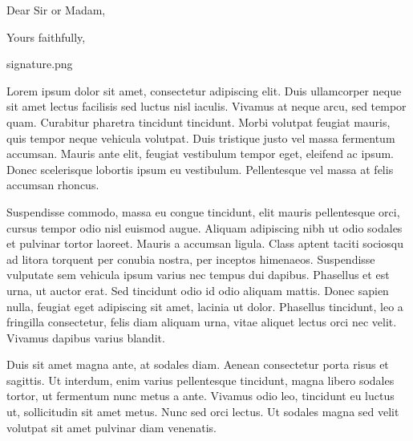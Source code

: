 \documentclass[11pt,a4paper,sans]{moderncv}        %
\begin{document}

\clearpage
\date{January 01, 1984}
\subject{Job application}
\opening{Dear Sir or Madam,}
\closing{Yours faithfully,}
\signature{0.9}{signature.png}                     %
\makelettertitle

Lorem ipsum dolor sit amet, consectetur adipiscing elit. Duis ullamcorper neque sit amet lectus facilisis sed luctus nisl iaculis. Vivamus at neque arcu, sed tempor quam. Curabitur pharetra tincidunt tincidunt. Morbi volutpat feugiat mauris, quis tempor neque vehicula volutpat. Duis tristique justo vel massa fermentum accumsan. Mauris ante elit, feugiat vestibulum tempor eget, eleifend ac ipsum. Donec scelerisque lobortis ipsum eu vestibulum. Pellentesque vel massa at felis accumsan rhoncus.

Suspendisse commodo, massa eu congue tincidunt, elit mauris pellentesque orci, cursus tempor odio nisl euismod augue. Aliquam adipiscing nibh ut odio sodales et pulvinar tortor laoreet. Mauris a accumsan ligula. Class aptent taciti sociosqu ad litora torquent per conubia nostra, per inceptos himenaeos. Suspendisse vulputate sem vehicula ipsum varius nec tempus dui dapibus. Phasellus et est urna, ut auctor erat. Sed tincidunt odio id odio aliquam mattis. Donec sapien nulla, feugiat eget adipiscing sit amet, lacinia ut dolor. Phasellus tincidunt, leo a fringilla consectetur, felis diam aliquam urna, vitae aliquet lectus orci nec velit. Vivamus dapibus varius blandit.

Duis sit amet magna ante, at sodales diam. Aenean consectetur porta risus et sagittis. Ut interdum, enim varius pellentesque tincidunt, magna libero sodales tortor, ut fermentum nunc metus a ante. Vivamus odio leo, tincidunt eu luctus ut, sollicitudin sit amet metus. Nunc sed orci lectus. Ut sodales magna sed velit volutpat sit amet pulvinar diam venenatis.
\end{document}
